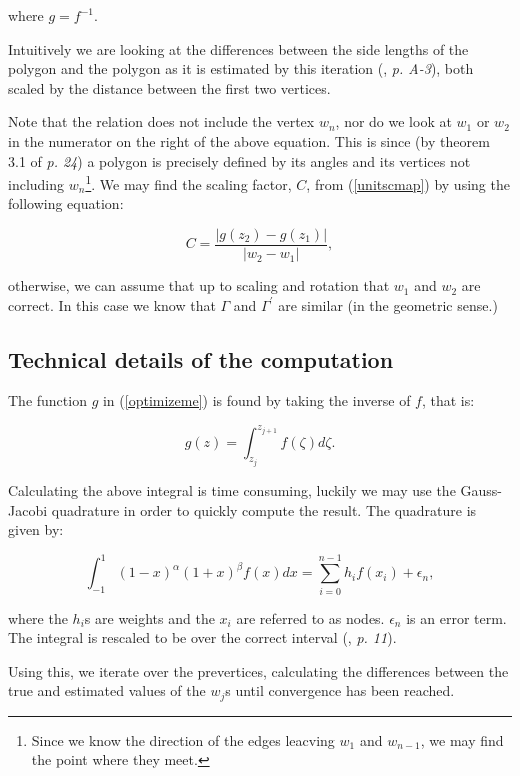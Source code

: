 \documentclass[a4paper,10pt]{amsart}
\begin{document}
where $g=f^{-1}$. 

Intuitively we are looking at the differences between the side lengths of the polygon and the polygon as it is estimated by this iteration (\cite{snider}, \emph{p. A-3}), both scaled by the distance between the first two vertices.

Note that the relation does not include the vertex $w_n$, nor do we look at $w_1$ or $w_2$ in the numerator on the right of the above equation. This is since (by theorem 3.1 of \cite{driscoll} \emph{p. 24}) a polygon is precisely defined by its angles and its vertices not including $w_n$\footnote{Since we know the direction of the edges leacving $w_1$ and $w_{n-1}$, we may find the point where they meet.}. We may find the scaling factor, $C$, from (\ref{unitscmap}) by using the following equation:

\begin{equation}
C=\frac{\vert g(z_2)-g(z_1)\vert}{\vert w_2 - w_1\vert},
\end{equation}

otherwise, we can assume that up to scaling and rotation that $w_1$ and $w_2$ are correct. In this case we know that $\Gamma$ and $\Gamma^\prime$ are similar (in the geometric sense.) 


\subsection{Technical details of the computation}

The function $g$ in (\ref{optimizeme}) is found by taking the inverse of $f$, that is:

\begin{equation}
g(z) = \int_{z_j}^{z_{j+1}} f(\zeta) d\zeta.
\end{equation}

Calculating the above integral is time consuming, luckily we may use the Gauss-Jacobi quadrature in order to quickly compute the result. The quadrature is given by:

\begin{equation}
\int_{-1}^{1} (1-x)^\alpha (1+x)^\beta f(x) dx = \sum_{i=0}^{n-1}h_if(x_i) + \epsilon_n,
\end{equation}

where the $h_i$s are weights and the $x_i$ are referred to as nodes. $\epsilon_n$ is an error term. The integral is rescaled to be over the correct interval (\cite{trefethen}, \emph{p. 11}).

Using this, we iterate over the prevertices, calculating the differences between the true and estimated values of the $w_j$s until convergence has been reached.
\end{document}
